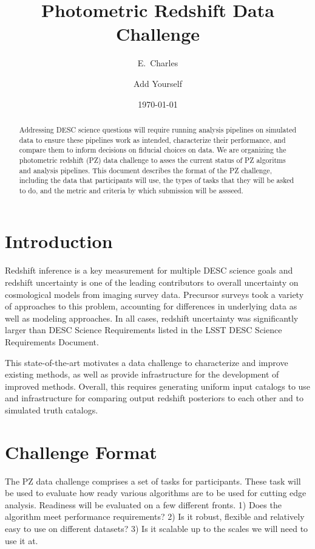 \documentclass[modern]{desc-tex/styles/lsstdescnote}
\begin{document}
\title{Photometric Redshift Data Challenge}
\author{E.\ Charles}
\author{Add Yourself} 
\date{\today}

\begin{abstract}
 Addressing DESC science questions will require running analysis
 pipelines on simulated data to ensure these pipelines work as
 intended, characterize their performance, and compare them to inform
 decisions on fiducial choices on data.  We are organizing the
 photometric redshift (PZ) data challenge to asses the current status
 of PZ algoritms and analysis pipelines.   This document describes the
 format of the PZ challenge, including the data that participants will
 use, the types of tasks that they will be asked to do, and the metric
 and criteria by which submission will be assseed.
 \end{abstract}

\maketitle

\section{Introduction}

Redshift inference is a key measurement for multiple DESC science
goals and redshift uncertainty is one of the leading contributors to
overall uncertainty on cosmological models from imaging survey
data. Precursor surveys took a variety of approaches to this problem,
accounting for differences in underlying data as well as modeling
approaches. In all cases, redshift uncertainty was significantly
larger than DESC Science Requirements listed in the LSST DESC Science
Requirements Document.

This state-of-the-art motivates a data challenge to characterize and
improve existing methods, as well as provide infrastructure for the
development of improved methods. Overall, this requires generating
uniform input catalogs to use and infrastructure for comparing output
redshift posteriors to each other and to simulated truth catalogs.


\section{Challenge Format}

The PZ data challenge comprises a set of tasks for participants.
These task will be used to evaluate how ready various algorithms are
to be used for cutting edge analysis.  Readiness will be evaluated on
a few different fronts.  1) Does the algorithm meet performance
requirements?  2) Is it robust, flexible and relatively easy to use on
different datasets?  3) Is it scalable up to the scales we will need
to use it at.
\end{document}
